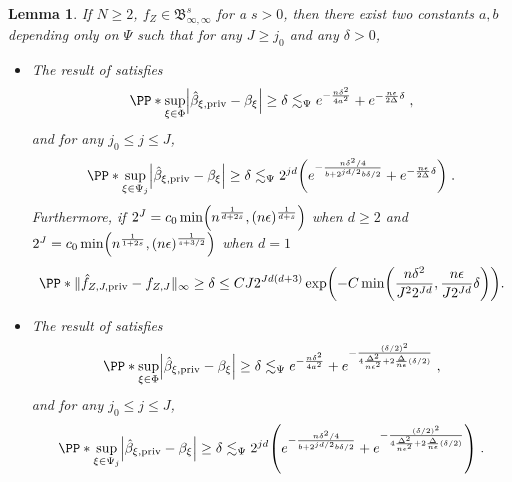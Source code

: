 \documentclass{article}
\newcommand{\1}{\mathds{1}}
\DeclarePairedDelimiter{\abs}{\lvert}{\rvert}
\DeclarePairedDelimiter{\paren}{\lparen}{\rparen}
\theoremstyle{plain}
\newtheorem{lemma}{Lemma}[section]
\theoremstyle{definition}
\theoremstyle{remark}
\begin{document}
\begin{lemma}
    \label{lemma:HP_coeffs_and_func_inequalities}
    If $N \geq 2$, $f_Z \in \mathfrak{B}_{\infty, \infty}^s$ for a $s>0$, then there exist two constants $a, b$ depending only on $\Psi$ such that for any $J \geq j_0$ and any $\delta > 0$,

    \begin{itemize}
        \item The result of  satisfies
        \begin{equation}
            \PP*{\sup_{\xi \in \Phi} \abs*{\hat{\beta}_{\xi, \textrm{priv}} - {\beta}_{\xi}} \geq \delta} \lesssim_{\Psi} e^{- \frac{n \delta^2}{4a^2}} + e^{- \frac{n \epsilon}{2 \Delta} \delta} \;,
        \end{equation}
        and for any $j_0 \leq j \leq J$,
        \begin{equation}
            \PP*{\sup_{\xi \in \Psi_j} \abs*{\hat{\beta}_{\xi, \textrm{priv}} - {\beta}_{\xi}} \geq \delta} \lesssim_{\Psi} 2^{jd} \paren*{e^{- \frac{n \delta^2 / 4}{b+2^{jd/2} b \delta/2}} + e^{- \frac{n \epsilon}{2 \Delta} \delta} }\;.
        \end{equation}
        Furthermore, if $2^J = c_0 \min \paren*{n^{\frac{1}{d + 2s}}, (n \epsilon)^{\frac{1}{d+s}}}$ when $d \geq 2$ and $2^J = c_0 \min \paren*{n^{\frac{1}{1 + 2s}}, (n \epsilon)^{\frac{1}{s + 3/2}}}$ when $d=1$
        \begin{equation}
\label{eq:linfty-simple}
\PP*{\| \hat{f}_{Z, J, \textrm{priv}} - f_{Z, J} \|_{\infty} \geq \delta}
\leq
C J 2^{Jd(d+3)} \exp \paren*{-C \min \paren*{\frac{n\delta^2}{J^2 2^{Jd}}, \frac{n\epsilon}{J 2^{Jd}} \delta}} .
\end{equation}
        \item The result of  satisfies
        \begin{equation}
            \PP*{\sup_{\xi \in \Phi} \abs*{\hat{\beta}_{\xi, \textrm{priv}} - {\beta}_{\xi}} \geq \delta} \lesssim_{\Psi} e^{- \frac{n \delta^2}{4a^2}} + e^{-\frac{(\delta/2)^2}{4\frac{\Delta^2}{n \epsilon^2} + 2\frac{\Delta}{n \epsilon} (\delta/2)}} \;,
        \end{equation}
        and for any $j_0 \leq j \leq J$,
        \begin{equation}
            \PP*{\sup_{\xi \in \Psi_j} \abs*{\hat{\beta}_{\xi, \textrm{priv}} - {\beta}_{\xi}} \geq \delta} \lesssim_{\Psi} 2^{jd} \paren*{e^{- \frac{n \delta^2 / 4}{b+2^{jd/2} b \delta/2}} + e^{-\frac{(\delta/2)^2}{4\frac{\Delta^2}{n \epsilon^2} + 2\frac{\Delta}{n \epsilon} (\delta/2)}} }\;.

\end{equation}
\end{itemize}
\end{lemma}
\end{document}
